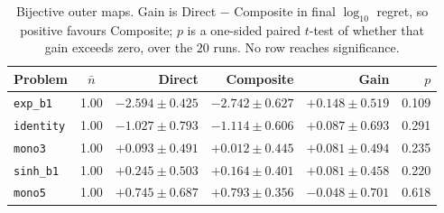 \begin{table}[H]
\centering
\small
\caption{Bijective outer maps. Gain is Direct $-$ Composite in final $\log_{10}$ regret, so positive favours Composite; $p$ is a one-sided paired $t$-test of whether that gain exceeds zero, over the $20$ runs. No row reaches significance.}
\label{tab:bij}
\begin{tabular}{l c r r r r}
\toprule
Problem & $\bar n$ & Direct & Composite & Gain & $p$ \\
\midrule
\texttt{exp\_b1} & 1.00 & $-2.594\pm0.425$ & $-2.742\pm0.627$ & $\mathbf{+0.148}\pm0.519$ & 0.109 \\
\texttt{identity} & 1.00 & $-1.027\pm0.793$ & $-1.114\pm0.606$ & $\mathbf{+0.087}\pm0.693$ & 0.291 \\
\texttt{mono3} & 1.00 & $+0.093\pm0.491$ & $+0.012\pm0.445$ & $\mathbf{+0.081}\pm0.494$ & 0.235 \\
\texttt{sinh\_b1} & 1.00 & $+0.245\pm0.503$ & $+0.164\pm0.401$ & $\mathbf{+0.081}\pm0.458$ & 0.220 \\
\texttt{mono5} & 1.00 & $+0.745\pm0.687$ & $+0.793\pm0.356$ & $\mathbf{-0.048}\pm0.701$ & 0.618 \\
\bottomrule
\end{tabular}
\end{table}
